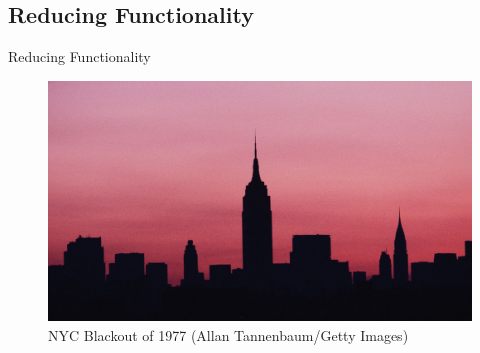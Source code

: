\documentclass[11pt,t,usepdftitle=false,aspectratio=169]{beamer}
\begin{document}
\subsection{Reducing Functionality}
\begin{frame}{Reducing Functionality~\cite{Dhanjani:2013:HLSEPHPWLS, Ronen:2018:IGNCZCR, Bhartiya::YSFMK}}

	\centering
	\begin{figure}
		\includegraphics{img/nyc-blackout.jpg}
		\caption{NYC Blackout of 1977 (Allan Tannenbaum/Getty Images)}
	\end{figure}
\end{frame}
\end{document}
